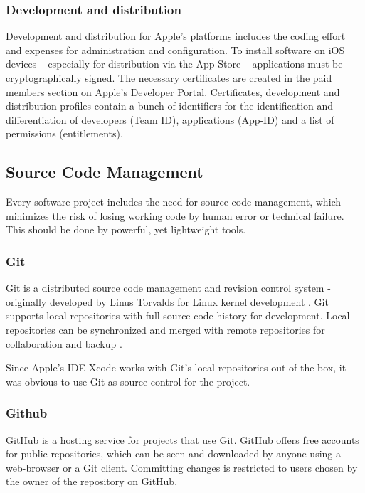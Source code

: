 \subsubsection{Development and distribution}
\label{sec:DAD}
Development and distribution for Apple's platforms includes the coding effort and expenses for administration and configuration. 
To install software on iOS devices – especially for distribution via the App Store – applications must be cryptographically signed. 
The necessary certificates are created in the paid members section on Apple's Developer Portal. 
Certificates, development and distribution profiles contain a bunch of identifiers for the identification and differentiation of developers (Team ID), 
applications (App-ID) and a list of permissions (entitlements). 

\subsection{Source Code Management}
\label{sec:SCM}

Every software project includes the need for source code management,
which minimizes the risk of losing working code
by human error or technical failure.
This should be done by powerful, yet lightweight tools.



\subsubsection{Git}

Git is a distributed source code management and revision control system 
- originally developed by Linus Torvalds for Linux kernel development \cite{Git:Main}.
Git supports local repositories with full source code history for development.
Local repositories can be synchronized and merged with remote repositories for collaboration and backup
\cite{Chacon:2009:PG:1618548}.

Since Apple's IDE Xcode works with Git's local repositories out of the box,
it was obvious to use Git as source control for the project.

\subsubsection{Github}

GitHub \cite{GitHub:Main} is a hosting service for projects that use Git. 
GitHub offers free accounts for public repositories, 
which can be seen and downloaded by anyone
using a web-browser or a Git client.
Committing changes is restricted to users chosen by the owner of the repository on GitHub.


